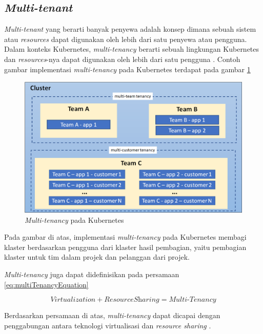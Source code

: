 \subsection{\emph{Multi-tenant}}

\emph{Multi-tenant} yang berarti banyak penyewa adalah konsep dimana sebuah sistem
atau \emph{resources} dapat digunakan oleh lebih dari satu penyewa atau pengguna. Dalam
konteks Kubernetes, \emph{multi-tenancy} berarti sebuah lingkungan Kubernetes dan \emph{resources}-nya
dapat digunakan oleh lebih dari satu pengguna \parencite{oliva_multi-tenancy_2024}. Contoh gambar
implementasi \emph{multi-tenancy} pada Kubernetes terdapat pada gambar \ref{fig:KubernetesMultiTenancy}

\begin{figure} [H] \centering
  \includegraphics[scale=0.7]{gambar/multi-tenancy.png}
  \caption{\emph{Multi-tenancy} pada Kubernetes \parencite{kubernetes-website-multi-tenancy}}
  \label{fig:KubernetesMultiTenancy}
\end{figure}

Pada gambar di atas, implementasi \emph{multi-tenancy} pada Kubernetes
membagi klaster berdasarkan pengguna dari klaster hasil pembagian, yaitu pembagian
klaster untuk tim dalam projek dan pelanggan dari projek.

\emph{Multi-tenancy} juga dapat didefinisikan pada persamaan \ref{eq:multiTenancyEquation}

\begin{equation}
  \textit{Virtualization} + \textit{ResourceSharing} = \textit{Multi-Tenancy}
  \label{eq:multiTenancyEquation}
\end{equation}

Berdasarkan persamaan di atas, \emph{multi-tenancy} dapat dicapai dengan penggabungan antara
teknologi virtualisasi dan \emph{resource sharing} \parencite{6830928}.

